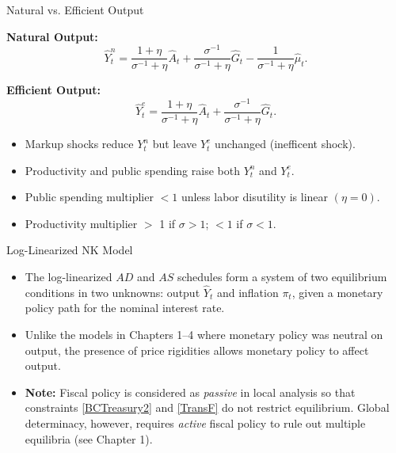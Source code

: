 \documentclass[11pt,aspectratio=169]{beamer}
\begin{document}
\begin{frame}[label=NatEffOutput]{Natural vs. Efficient Output}
\small

\textbf{Natural Output:}
\begin{equation}
\hat{Y}_t^n
=
\frac{1+\eta}{\sigma^{-1}+\eta}\hat{A}_t
+
\frac{\sigma^{-1}}{\sigma^{-1}+\eta}\hat{G}_t
-
\frac{1}{\sigma^{-1}+\eta}\hat{\mu}_t.
\label{NaturalOutput}
\end{equation}

\textbf{Efficient Output:}
\begin{equation}
\hat{Y}_t^e
=
\frac{1+\eta}{\sigma^{-1}+\eta}\hat{A}_t
+
\frac{\sigma^{-1}}{\sigma^{-1}+\eta}\hat{G}_t.
\label{EfficientOutput1}
\end{equation}

\begin{itemize}
    \item Markup shocks reduce $Y_t^n$ but leave $Y_t^e$ unchanged (inefficent shock).
    \item Productivity and public spending raise both $Y_t^n$ and $Y_t^e$.
    \item Public spending multiplier $< 1$ unless labor disutility is linear $(\eta = 0)$.
    \item Productivity multiplier $>$ 1 if $\sigma > 1$; $< 1$ if $\sigma < 1$.
\end{itemize}

\begin{center}
\hyperlink{Appendix F}{}
\end{center}

\end{frame}
\begin{frame}[label=NKFeatures]{Log-Linearized NK Model}
\small

\begin{itemize}
    \item The log-linearized $AD$ and $AS$ schedules form a system of two equilibrium conditions in two unknowns: output $\hat{Y}_t$ and inflation $\pi_t$, given a monetary policy path for the nominal interest rate.
    \vspace{1em}
    \item Unlike the models in Chapters 1--4 where monetary policy was neutral on output, the presence of price rigidities allows monetary policy to affect output.
\vspace{1em}
\item \textbf{Note:} Fiscal policy is considered as \emph{passive} in local analysis so that constraints \eqref{BCTreasury2} and \eqref{TransF} do not restrict equilibrium. Global determinacy, however, requires \emph{active} fiscal policy to rule out multiple equilibria (see Chapter 1).
\end{itemize}

\end{frame}
\end{document}
